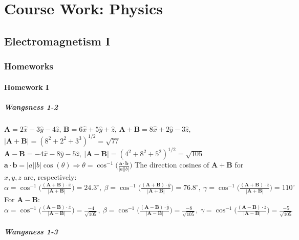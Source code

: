 \documentclass[oneside]{book}
\theoremstyle{definition}
\newcommand*\B[1]{\mathbf{#1}}
\begin{document}
\part{Course Work: Physics}

\chapter{Electromagnetism I}

\section{Homeworks}

\subsection*{Homework I}

\subsubsection{Wangsness 1-2}

$\B{A} =  2\hat{x} - 3\hat{y} - 4\hat{z}$, $\B{B} = 6\hat{x} + 5\hat{y} + \hat{z}$, $\B{A+B} = 8\hat{x} + 2\hat{y} - 3\hat{z}$, $|\B{A+B}| = (8^2 + 2^2 + 3^3)^{1/2} = \sqrt{77}$ \\ $\B{A-B} = -4\hat{x} -8 \hat{y} - 5\hat{z},\ |\B{A-B}| = (4^2 + 8^2 + 5^2)^{1/2}=\sqrt{105}$ \\
$\B{a}\cdot \B{b} = |a||b|\cos(\theta) \Rightarrow \theta = \cos^{-1}\big(\frac{\B{a}\cdot \B{b}}{|a||b|}\big)$ The direction cosines of $\B{A+B}$ for $x,y,z$ are, respectively: \\
$\alpha = \cos^{-1}\big(\frac{(\B{A+B})\cdot \hat{x}}{|\B{A+B}|}\big)=24.3^{\circ},\ \beta = \cos^{-1}\big(\frac{(\B{A+B})\cdot \hat{y}}{|\B{A+B}|}\big)=76.8^{\circ},\ \gamma = \cos^{-1}\big(\frac{(\B{A+B})\cdot \hat{z}}{|\B{A+B}|}\big)=110^{\circ}$\\
For $\B{A-B}$:\\
$\alpha = \cos^{-1}\big(\frac{(\B{A-B})\cdot \hat{x}}{|\B{A-B}|}\big)=\frac{-4}{\sqrt{105}},\ \beta = \cos^{-1}\big(\frac{(\B{A-B})\cdot \hat{y}}{|\B{A-B}|}\big)=\frac{-8}{\sqrt{105}},\ \gamma = \cos^{-1}\big(\frac{(\B{A-B})\cdot \hat{z}}{|\B{A-B}|}\big)=\frac{-5}{\sqrt{105}}$ 

\subsubsection{Wangsness 1-3}
\end{document}
